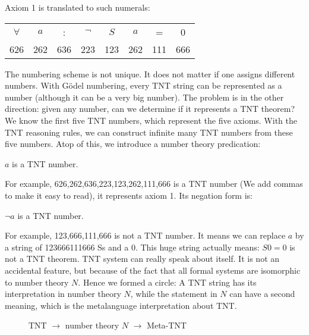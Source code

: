 \documentclass[b5paper]{article}
\begin{document}
Axiom 1 is translated to such numerals:

\begin{tabular}{cccccccc}
$\forall$ & $a$ & : & $\lnot$ & $S$ & $a$ & = & 0 \\
626 & 262 & 636 & 223 & 123 & 262 & 111 & 666 \\
\end{tabular}

The numbering scheme is not unique. It does not matter if one assigns different numbers. With Gödel numbering, every TNT string can be represented as a number (although it can be a very big number). The problem is in the other direction: given any number, can we determine if it represents a TNT theorem? We know the first five TNT numbers, which represent the five axioms. With the TNT reasoning rules, we can construct infinite many TNT numbers from these five numbers. Atop of this, we introduce a number theory predication:

\begin{center}
$a$ is a TNT number.
\end{center}

For example, 626,262,636,223,123,262,111,666 is a TNT number (We add commas to make it easy to read), it represents axiom 1. Its negation form is:

\begin{center}
$\lnot a$ is a TNT number.
\end{center}

For example, 123,666,111,666 is not a TNT number. It means we can replace $a$ by a string of 123666111666 Ss and a 0. This huge string actually means: $S0 = 0$ is not a TNT theorem. TNT system can really speak about itself. It is not an accidental feature, but because of the fact that all formal systems are isomorphic to number theory $N$. Hence we formed a circle: A TNT string has its interpretation in number theory $N$, while the statement in $N$ can have a second meaning, which is the metalanguage interpretation about TNT.

\begin{figure}[htbp]
\centering
{}
\caption{TNT $\to$ number theory $N$ $\to$ Meta-TNT}
\label{fig:TNT-N-TNT}
\end{figure}
\end{document}
